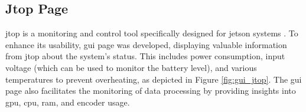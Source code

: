 \subsection{Jtop Page}
\label{sec:gui_jtop}
\gls{jtop} is a monitoring and control tool specifically designed for \gls{jetson} systems \cite{bonghiJtopRbonghiJetson}.
To enhance its usability, \gls{gui} page was developed, displaying valuable information from \gls{jtop} about the \jx system's status.
This includes power consumption, input voltage (which can be used to monitor the battery level), and various temperatures to prevent overheating, as depicted in Figure \ref{fig:gui_jtop}.
The \gls{gui} page also facilitates the monitoring of data processing by providing insights into \gls{gpu}, \gls{cpu}, \gls{ram}, and encoder usage.

